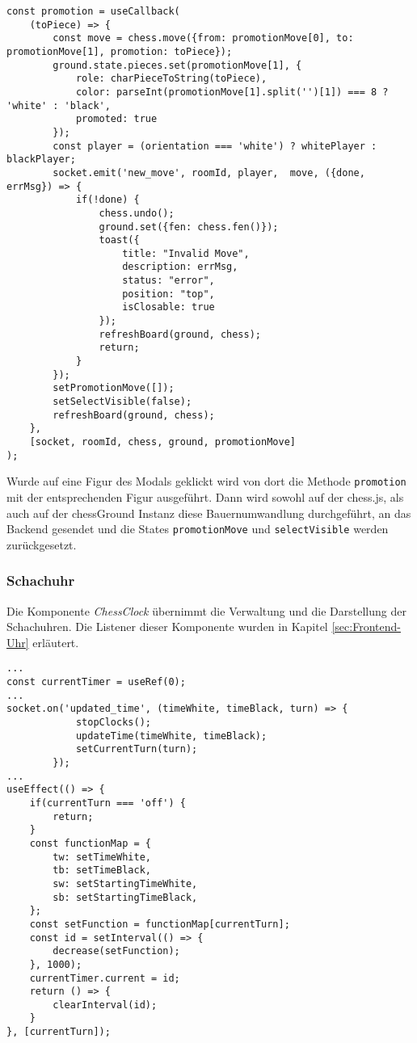 \begin{lstlisting}[style=codeStyle, caption={Die promotion Methode}, label={lst:promotion}]
const promotion = useCallback(
    (toPiece) => {
        const move = chess.move({from: promotionMove[0], to: promotionMove[1], promotion: toPiece});
        ground.state.pieces.set(promotionMove[1], {
            role: charPieceToString(toPiece),
            color: parseInt(promotionMove[1].split('')[1]) === 8 ? 'white' : 'black',
            promoted: true
        });
        const player = (orientation === 'white') ? whitePlayer : blackPlayer;
        socket.emit('new_move', roomId, player,  move, ({done, errMsg}) => {
            if(!done) {
                chess.undo();
                ground.set({fen: chess.fen()});
                toast({
                    title: "Invalid Move",
                    description: errMsg,
                    status: "error",
                    position: "top",
                    isClosable: true
                });
                refreshBoard(ground, chess);
                return;
            }
        });
        setPromotionMove([]);
        setSelectVisible(false);
        refreshBoard(ground, chess);
    },
    [socket, roomId, chess, ground, promotionMove]
);
\end{lstlisting}

Wurde auf eine Figur des Modals geklickt wird von dort die Methode \verb|promotion| mit der entsprechenden Figur ausgeführt. Dann wird sowohl auf der chess.js, als auch auf der chessGround Instanz diese Bauernumwandlung durchgeführt, an das Backend gesendet und die States \verb|promotionMove| und \verb|selectVisible| werden zurückgesetzt. 

\subsubsection{Schachuhr}
\label{sec:impl-schachuhr}
Die Komponente \textit{ChessClock} übernimmt die Verwaltung und die Darstellung der Schachuhren. Die Listener dieser Komponente wurden in Kapitel \ref{sec:Frontend-Uhr} erläutert.

\begin{lstlisting}[style=codeStyle, caption={Ausschnitt der \textit{ChessClock}-Komponente}, label={lst:ChessClock}]
...
const currentTimer = useRef(0);
...
socket.on('updated_time', (timeWhite, timeBlack, turn) => {
            stopClocks();
            updateTime(timeWhite, timeBlack);
            setCurrentTurn(turn);
        });
...
useEffect(() => {
    if(currentTurn === 'off') {
        return;
    }
    const functionMap = {
        tw: setTimeWhite,
        tb: setTimeBlack,
        sw: setStartingTimeWhite,
        sb: setStartingTimeBlack,
    };
    const setFunction = functionMap[currentTurn];
    const id = setInterval(() => {
        decrease(setFunction);
    }, 1000);
    currentTimer.current = id;
    return () => {
        clearInterval(id);
    }
}, [currentTurn]);
\end{lstlisting}

